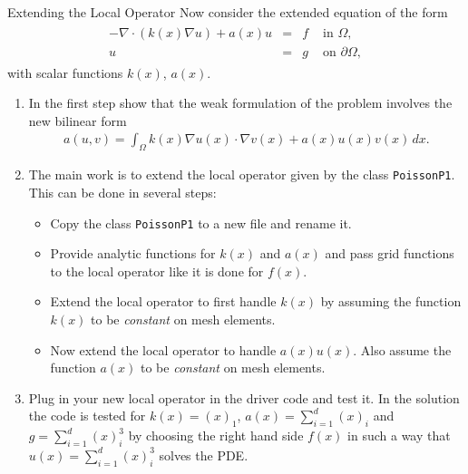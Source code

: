 \documentclass[12pt,a4paper]{article}
\begin{document}
\begin{Exercise}{Extending the Local Operator}
Now consider the extended equation of the form
\begin{align}
    \begin{array}{rcll}
      -\nabla\cdot (k(x) \nabla u) +a(x) u  & = & f & \text{ in } \Omega, \\
      u & = & g & \text{ on } \partial\Omega,
    \end{array}
\end{align}
with scalar functions $k(x)$, $a(x)$.

\begin{enumerate}
\item In the first step show that the weak formulation of the problem
  involves the new bilinear form
  \begin{align}
    a(u,v) = \int_\Omega k(x) \nabla u(x) \cdot \nabla v(x) + a(x) u(x) v(x) \,dx .
  \end{align}
\item The main work is to extend the local operator given by the class
  \lstinline{PoissonP1}. This can be done in several steps:
  \begin{itemize}
  \item Copy the class \lstinline{PoissonP1} to a new file and rename it.
  \item Provide analytic functions for $k(x)$ and $a(x)$ and pass
    grid functions to the local operator like it is done for $f(x)$.
  \item Extend the local operator to first handle $k(x)$ by assuming the
    function $k(x)$ to be \emph{constant} on mesh elements.
  \item Now extend the local operator to handle $a(x) u(x)$. Also assume
    the function $a(x)$ to be \emph{constant} on mesh elements.
  \end{itemize}
\item Plug in your new local operator in the driver code and test it.
  In the solution the code is tested for $k(x)=(x)_1$,
  $a(x)=\sum_{i=1}^{d}(x)_i$ and $g=\sum_{i=1}^d (x)_i^3$ by choosing
  the right hand side $f(x)$ in such a way that $u(x)=\sum_{i=1}^d
  (x)_i^3$ solves the PDE.
\end{enumerate}
\end{Exercise}
\end{document}
